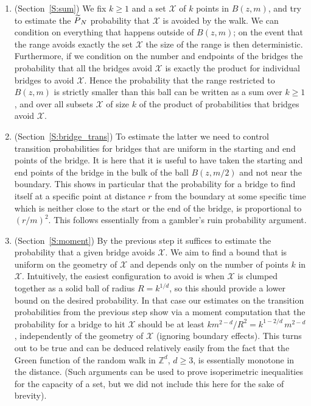 \documentclass[10pt]{amsart}
\theoremstyle{definition}\newtheorem{defi}[theo]{Definition}\newtheorem{rema}[theo]{Remark}\newtheorem{exam}[theo]{Example}\newtheorem{exem}[theo]{Example}\newtheorem{nota}[theo]{Notation}
\newcommand{\cX}{\mathcal{X}}
\let\oldtilde\tilde
\renewcommand*{\tilde}[1]{\mathchoice{\widetilde{#1}}{\widetilde{#1}}{\oldtilde{#1}}{\oldtilde{#1}}}\let\oldhat\hat
\renewcommand*{\hat}[1]{\mathchoice{\widehat{#1}}{\widehat{#1}}{\oldhat{#1}}{\oldhat{#1}}}\let\oldexists\exists
\renewcommand*{\exists}{\mathrel{\oldexists}}
\begin{document}
\begin{enumerate}
\item (Section~\ref{S:sum})\label{list.2.3.1.3} We fix $k \ge 1$ and a set $\cX$ of $k$ points in $B(z, m)$, and try to estimate the $\tilde P_N$ probability that $\cX$ is avoided by the walk. We can condition on everything that happens outside of $B(z,m)$; on the event that the range avoids exactly the set $\cX$ the size of the range is then deterministic. Furthermore, if we condition on the number and endpoints of the bridges the probability that all the bridges avoid $\cX$ is exactly the product for individual bridges to avoid $\cX$. Hence the probability that the range restricted to $B(z,m)$ is strictly smaller than this ball can be written as a sum over $k\ge 1$, and over all subsets $\cX$ of size $k$ of the product of probabilities that bridges avoid $\cX$.
%
\item (Section~\ref{S:bridge_trans})\label{list.2.3.1.4} To estimate the latter we need to control transition probabilities for bridges that are uniform in the starting and end points of the bridge. It is here that it is useful to have taken the starting and end points of the bridge in the bulk of the ball $B(z, m/2)$ and not near the boundary. This shows in particular that the probability for a bridge to find itself at a specific point at distance $r$ from the boundary at some specific time which is neither close to the start or the end of the bridge, is proportional to $(r/m)^2$. This follows essentially from a gambler's ruin probability argument.


\item (Section~\ref{S:moment})\label{list.2.3.1.5} By the previous step it suffices to estimate the probability that a given bridge avoids $\cX$. We aim to find a bound that is uniform on the geometry of $\cX$ and depends only on the number of points $k$ in $\cX$. Intuitively, the easiest configuration to avoid is when $\cX$ is clumped together as a solid ball of radius $R = k^{1/d}$, so this should provide a lower bound on the desired probability. In that case our estimates on the transition probabilities from the previous step show via a moment computation that the probability for a bridge to hit $\cX$ should be at least $km^{2-d}/R^2 = k^{1- 2/d}\,m^{2-d}$, independently of the geometry of $\cX$ (ignoring boundary effects). This turns out to be true and can be deduced relatively easily from the fact that the Green function of the random walk in $\mathbb{Z}^d$, $d \ge 3$, is essentially monotone in the distance. (Such arguments can be used to prove isoperimetric inequalities for the capacity of a set, but we did not include this here for the sake of brevity).
\end{enumerate}
\end{document}
